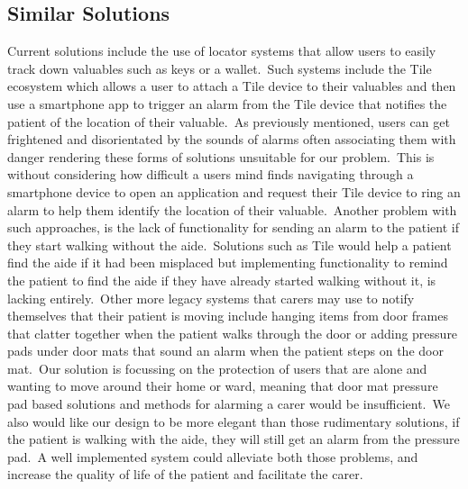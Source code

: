         \subsection{Similar Solutions}
            Current solutions include the use of locator systems that allow users to easily track down valuables such as
            keys or a wallet.\ Such systems include the Tile ecosystem which allows a user to attach a Tile device to
            their valuables and then use a smartphone app to trigger an alarm from the Tile device that notifies the
            patient of the location of their valuable.\ As previously mentioned, users can get frightened and
            disorientated by the sounds of alarms often associating them with danger rendering these forms of solutions
            unsuitable for our problem.\ This is without considering how difficult a users mind finds navigating through
            a smartphone device to open an application and request their Tile device to ring an alarm to help them
            identify the location of their valuable.\ Another problem with such approaches, is the lack of functionality
            for sending an alarm to the patient if they start walking without the aide.\ Solutions such as Tile would
            help a patient find the aide if it had been misplaced but implementing functionality to remind the patient
            to find the aide if they have already started walking without it, is lacking entirely.\ Other more legacy
            systems that carers may use to notify themselves that their patient is moving include hanging items from
            door frames that clatter together when the patient walks through the door or adding pressure pads under door
            mats that sound an alarm when the patient steps on the door mat.\ Our solution is focussing on the protection
            of users that are alone and wanting to move around their home or ward, meaning that door mat pressure pad
            based solutions and methods for alarming a carer would be insufficient.\ We also would like our design to be
            more elegant than those rudimentary solutions, if the patient is walking with the aide, they will still get
            an alarm from the pressure pad.\ A well implemented system could alleviate both those problems, and increase
            the quality of life of the patient and facilitate the carer.

